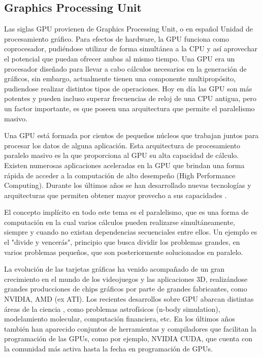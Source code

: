 \subsection{Graphics Processing Unit}
Las siglas GPU provienen de Graphics Processing Unit, o en español Unidad de
procesamiento gráfico. Para efectos de hardware, la GPU funciona como
coprocesador, pudiéndose utilizar de forma simultánea a la CPU y así aprovechar
el potencial que puedan ofrecer ambas al mismo tiempo.  Una GPU era un
procesador diseñado para llevar a cabo cálculos necesarios en la generación de
gráficos, sin embargo, actualmente tienen una componente multipropósito,
pudiendose realizar distintos tipos de operaciones. Hoy en día las GPU son más
potentes y pueden incluso superar frecuencias de reloj de una CPU antigua, pero
un factor importante, es que poseen una arquitectura que permite el paralelismo
masivo.

Una GPU está formada por cientos de pequeños núcleos que trabajan juntos para
procesar los datos de alguna aplicación. Esta arquitectura de procesamiento
paralelo masivo es la que proporciona al GPU su alta capacidad de cálculo.
Existen numerosas aplicaciones aceleradas en la GPU que brindan una forma
rápida de acceder a la computación de alto desempeño (High Performance
Computing). Durante los últimos años se han desarrollado nuevas tecnologías y
arquitecturas que permiten obtener mayor provecho a sus capacidades
\cite{owens2007gpu}.

El concepto implícito en todo este tema es el paralelismo, que es una forma de
computación en la cual varios cálculos pueden realizarse simultáneamente,
siempre y cuando no existan dependencias secuenciales entre ellos. Un ejemplo
es el "divide y vencerás", principio que busca dividir los problemas grandes,
en varios problemas pequeños, que son posteriormente solucionados en paralelo.

La evolución de las tarjetas gráficas ha venido acompañado de un gran
crecimiento en el mundo de los videojuegos y las aplicaciones 3D, realizándose
grandes producciones de chips gráficos por parte de grandes fabricantes, como
NVIDIA, AMD (ex ATI). Los recientes desarrollos sobre GPU abarcan distintas
áreas de la ciencia \cite{kirk2010programming}, como problemas astrofísicos
(n-body simulation), modelamiento molecular, computación financiera, etc. En
los últimos años también han aparecido conjuntos de herramientas y compiladores
que facilitan la programación de las GPUs, como por ejemplo, NVIDIA CUDA, que
cuenta con la comunidad más activa hasta la fecha en programación de GPUs.

